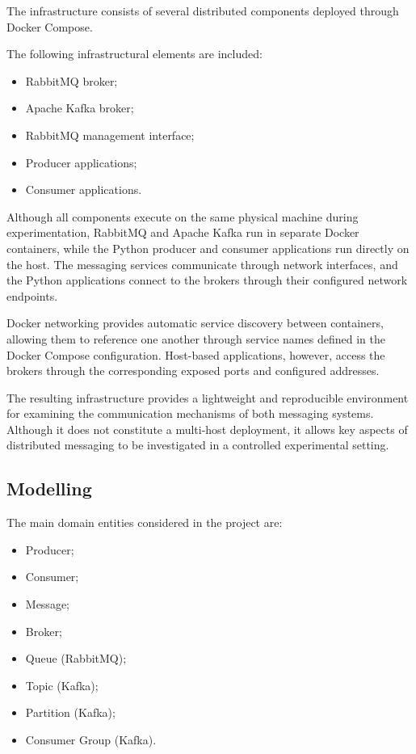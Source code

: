 \documentclass{scrartcl}
\begin{document}
The infrastructure consists of several distributed components deployed through Docker Compose.

The following infrastructural elements are included:

\begin{itemize}
\item RabbitMQ broker;
\item Apache Kafka broker;
\item RabbitMQ management interface;
\item Producer applications;
\item Consumer applications.
\end{itemize}

Although all components execute on the same physical machine during experimentation, RabbitMQ and Apache Kafka run in separate Docker containers, while the Python producer and consumer applications run directly on the host. The messaging services communicate through network interfaces, and the Python applications connect to the brokers through their configured network endpoints.

Docker networking provides automatic service discovery between containers, allowing them to reference one another through service names defined in the Docker Compose configuration. Host-based applications, however, access the brokers through the corresponding exposed ports and configured addresses.

The resulting infrastructure provides a lightweight and reproducible environment for examining the communication mechanisms of both messaging systems. Although it does not constitute a multi-host deployment, it allows key aspects of distributed messaging to be investigated in a controlled experimental setting.

\subsection{Modelling}\label{modelling}

The main domain entities considered in the project are:

\begin{itemize}
    \item Producer;
    \item Consumer;
    \item Message;
    \item Broker;
    \item Queue (RabbitMQ);
    \item Topic (Kafka);
    \item Partition (Kafka);
    \item Consumer Group (Kafka).
\end{itemize}
\end{document}
